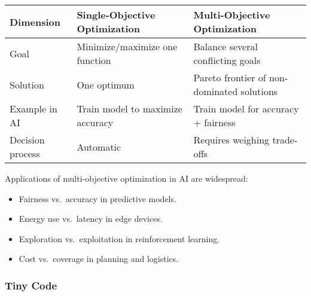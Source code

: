 \documentclass[
  letterpaper,
  DIV=11,
  numbers=noendperiod]{scrreprt}
\providecommand{\tightlist}{%
  \setlength{\itemsep}{0pt}\setlength{\parskip}{0pt}}
\begin{document}
\begin{longtable}[]{@{}
  >{\raggedright\arraybackslash}p{}
  >{\raggedright\arraybackslash}p{}
  >{\raggedright\arraybackslash}p{}@{}}
\toprule\noalign{}
\begin{minipage}[b]{\linewidth}\raggedright
Dimension
\end{minipage} & \begin{minipage}[b]{\linewidth}\raggedright
Single-Objective Optimization
\end{minipage} & \begin{minipage}[b]{\linewidth}\raggedright
Multi-Objective Optimization
\end{minipage} \\
\midrule\noalign{}
\endhead
\bottomrule\noalign{}
\endlastfoot
Goal & Minimize/maximize one function & Balance several conflicting
goals \\
Solution & One optimum & Pareto frontier of non-dominated solutions \\
Example in AI & Train model to maximize accuracy & Train model for
accuracy + fairness \\
Decision process & Automatic & Requires weighing trade-offs \\
\end{longtable}

Applications of multi-objective optimization in AI are widespread:

\begin{itemize}
\tightlist
\item
  Fairness vs.~accuracy in predictive models.
\item
  Energy use vs.~latency in edge devices.
\item
  Exploration vs.~exploitation in reinforcement learning.
\item
  Cost vs.~coverage in planning and logistics.
\end{itemize}

\subsubsection{Tiny Code}\label{tiny-code-66}
\end{document}
